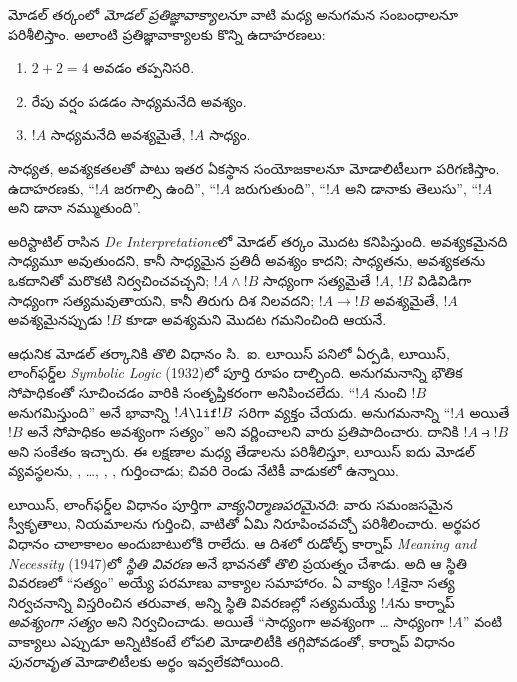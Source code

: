 \documentclass[../../../include/open-logic-section]{subfiles}
\begin{document}


మోడల్ తర్కంలో \emph{మోడల్ ప్రతిజ్ఞావాక్యాలనూ}
వాటి మధ్య అనుగమన సంబంధాలనూ పరిశీలిస్తాం.
అలాంటి ప్రతిజ్ఞావాక్యాలకు కొన్ని ఉదాహరణలు:
\begin{enumerate}
\item $2+2=4$ అవడం తప్పనిసరి.
\item రేపు వర్షం పడడం సాధ్యమనేది అవశ్యం.
\item $!A$ సాధ్యమనేది అవశ్యమైతే, $!A$ సాధ్యం.
\end{enumerate}
సాధ్యత, అవశ్యకతలతో పాటు ఇతర ఏకస్థాన సంయోజకాలనూ
మోడాలిటీలుగా పరిగణిస్తాం. ఉదాహరణకు, “$!A$ జరగాల్సి ఉంది”,
“$!A$ జరుగుతుంది”, “$!A$ అని డానాకు తెలుసు”,
“$!A$ అని డానా నమ్ముతుంది”.

అరిస్టాటిల్ రాసిన \emph{De Interpretatione}లో
మోడల్ తర్కం మొదట కనిపిస్తుంది. అవశ్యకమైనది
సాధ్యమూ అవుతుందని, కానీ సాధ్యమైన ప్రతిదీ
అవశ్యం కాదని; సాధ్యతను, అవశ్యకతను ఒకదానితో
మరొకటి నిర్వచించవచ్చని; $!A \land !B$
సాధ్యంగా సత్యమైతే $!A$, $!B$ విడివిడిగా
సాధ్యంగా సత్యమవుతాయని, కానీ తిరుగు దిశ
నిలవదని; $!A \to !B$ అవశ్యమైతే, $!A$
అవశ్యమైనప్పుడు $!B$ కూడా అవశ్యమని
మొదట గమనించింది ఆయనే.

ఆధునిక మోడల్ తర్కానికి తొలి విధానం
సి.~ఐ. లూయిస్ పనిలో ఏర్పడి,
లూయిస్, లాంగ్‌ఫర్డ్‌ల \emph{Symbolic Logic}
(1932)లో పూర్తి రూపం దాల్చింది. అనుగమనాన్ని భౌతిక
సోపాధికంతో సూచించడం వారికి సంతృప్తికరంగా అనిపించలేదు.
“$!A$ నుంచి $!B$ అనుగమిస్తుంది” అనే భావాన్ని
$!A \lif !B$ సరిగా వ్యక్తం చేయదు. అనుగమనాన్ని
“$!A$ అయితే $!B$ అనే సోపాధికం అవశ్యంగా సత్యం”
అని వర్ణించాలని వారు ప్రతిపాదించారు. దానికి
$!A \strictif !B$ అని సంకేతం ఇచ్చారు.
ఈ లక్షణాల మధ్య తేడాలను పరిశీలిస్తూ, లూయిస్ ఐదు
మోడల్ వ్యవస్థలను, , \ldots,
, , గుర్తించాడు;
చివరి రెండు నేటికీ వాడుకలో ఉన్నాయి.

లూయిస్, లాంగ్‌ఫర్డ్‌ల విధానం పూర్తిగా
\emph{వాక్యనిర్మాణపరమైనది}: వారు
సమంజసమైన స్వీకృతాలు, నియమాలను
గుర్తించి, వాటితో ఏమి నిరూపించవచ్చో
పరిశీలించారు. అర్థపర విధానం చాలాకాలం అందుబాటులోకి రాలేదు.
ఆ దిశలో రుడోల్ఫ్ కార్నాప్
\emph{Meaning and Necessity} (1947)లో
\emph{స్థితి వివరణ} అనే భావనతో తొలి
ప్రయత్నం చేశాడు. అది ఆ స్థితి
వివరణలో “సత్యం” అయ్యే పరమాణు
వాక్యాల సమాహారం. ఏ వాక్యం $!A$కైనా
సత్య నిర్వచనాన్ని విస్తరించిన తరువాత,
అన్ని స్థితి వివరణల్లో సత్యమయ్యే
$!A$ను కార్నాప్ \emph{అవశ్యంగా సత్యం}
అని నిర్వచించాడు. అయితే
“సాధ్యంగా అవశ్యంగా \ldots{}
సాధ్యంగా $!A$” వంటి వాక్యాలు
ఎప్పుడూ అన్నిటికంటే లోపలి మోడాలిటీకి తగ్గిపోవడంతో,
కార్నాప్ విధానం \emph{పునరావృత}
మోడాలిటీలకు అర్థం ఇవ్వలేకపోయింది.
\end{document}
